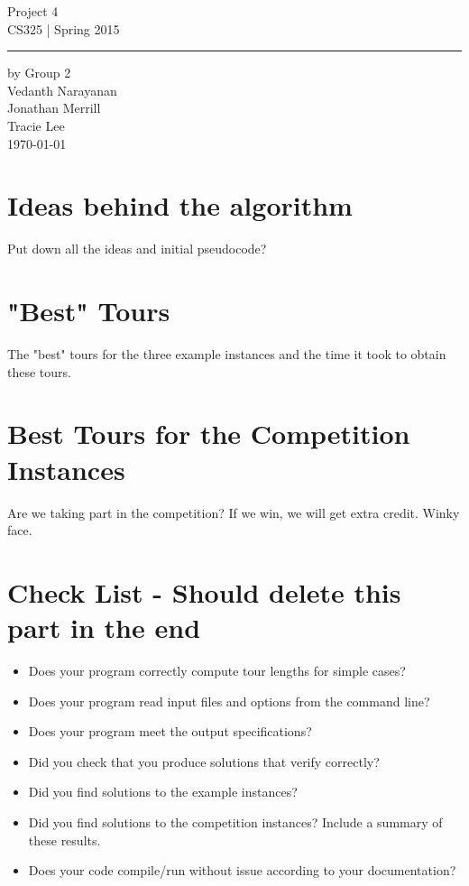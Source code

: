 \documentclass[11pt,letterpaper]{article}
\begin{document}
\begin{titlepage}
    \vspace*{4cm}
    \begin{flushright}
    {\huge
        Project 4\\[5mm]
    }
    {\large
        CS325 | Spring 2015
     }
    \end{flushright}
\hrule
    \begin{flushright}
	by Group 2\\
	Vedanth Narayanan\\
	Jonathan Merrill\\
	Tracie Lee\\
    \vfill
	\today\\
    \end{flushright}
\end{titlepage}

\raggedright

\section*{Ideas behind the algorithm}
Put down all the ideas and initial pseudocode?

\section*{"Best" Tours}
The "best" tours for the three example instances and the time it took to obtain these tours.

\section*{Best Tours for the Competition Instances}
Are we taking part in the competition? If we win, we will get extra credit. Winky face.

\section*{Check List - Should delete this part in the end}
\begin{itemize}
	\item Does your program correctly compute tour lengths for simple cases?
	\item Does your program read input files and options from the command line?
	\item Does your program meet the output specifications?
	\item Did you check that you produce solutions that verify correctly?
	\item Did you find solutions to the example instances?
	\item Did you find solutions to the competition instances? Include a summary of these results.
	\item Does your code compile/run without issue according to your documentation?
\end{itemize}
\end{document}
